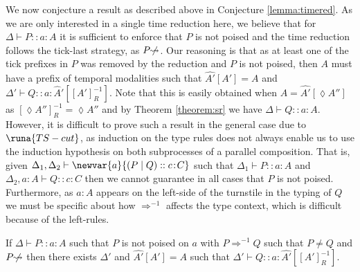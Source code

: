 %
We now conjecture a result as described above in Conjecture \ref{lemma:timered}. As we are only interested in a single time reduction here, we believe that for $\Delta\vdash P :: a\!:\!A$ it is sufficient to enforce that $P$ is not poised and the time reduction follows the tick-last strategy, as $P\!\not\!\leadsto$. Our reasoning is that as at least one of the tick prefixes in $P$ was removed by the reduction and $P$ is not poised, then $A$ must have a prefix of temporal modalities such that $\hat{A'}[A']=A$ and $\Delta'\vdash Q :: a\!:\!\hat{A}'[[A']^{-1}_R]$. Note that this is easily obtained when $A=\hat{A'}[\lozenge A'']$ as $[\lozenge A'']^{-1}_R=\lozenge A''$ and by Theorem \ref{theorem:sr} we have $\Delta\vdash Q :: a\!:\!A$. However, it is difficult to prove such a result in the general case due to $\runa{TS-cut}$, as induction on the type rules does not always enable us to use the induction hypothesis on both subprocesses of a parallel composition. That is, given $\Delta_1,\Delta_2\vdash \newvar{a}{(P \mid Q) :: c\!:\!C}$ such that $\Delta_1\vdash P :: a\!:\!A$ and $\Delta_2,a:A\vdash Q :: c\!:\!C$ then we cannot guarantee in all cases that $P$ is not poised. Furthermore, as $a:A$ appears on the left-side of the turnstile in the typing of $Q$ we must be specific about how $\Longrightarrow^{-1}$ affects the type context, which is difficult because of the left-rules. 

\begin{conj}
If $\Delta\vdash P :: a\!:\!A$ such that $P$ is not poised on $a$ with $P \Longrightarrow^{-1} Q$ such that $P \neq Q$ and $P\!\not\!\leadsto$ then there exists $\Delta'$ and $\hat{A'}[A']=A$ such that $\Delta'\vdash Q :: a\!:\!\hat{A'}[[A']^{-1}_R]$.
\label{lemma:timered}
\end{conj}

